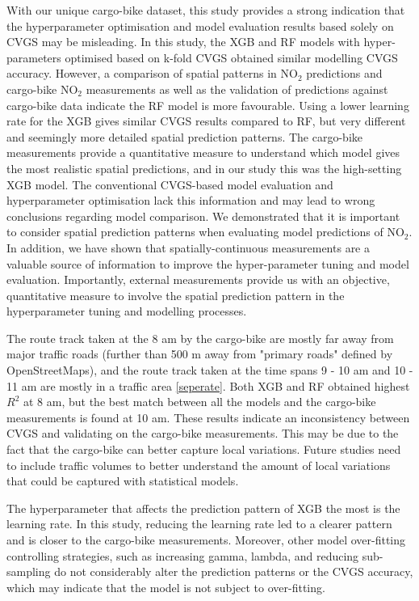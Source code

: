 \documentclass{article}
\begin{document}
With our unique cargo-bike dataset, this study provides a strong indication that the hyperparameter optimisation and model evaluation results based solely on CVGS may be misleading. In this study, the XGB and RF models with hyper-parameters optimised based on k-fold CVGS obtained similar modelling CVGS accuracy. However, a comparison of spatial patterns in NO$_2$ predictions and cargo-bike NO$_2$ measurements as well as the validation of predictions against cargo-bike data indicate the RF model is more favourable. Using a lower learning rate for the XGB gives similar CVGS results compared to RF, but very different and seemingly more detailed spatial prediction patterns. The cargo-bike measurements provide a quantitative measure to understand which model gives the most realistic spatial predictions, and in our study this was the high-setting XGB model. The conventional CVGS-based model evaluation and hyperparameter optimisation lack this information and may lead to wrong conclusions regarding model comparison. We demonstrated that it is important to consider spatial prediction patterns when evaluating model predictions of NO$_2$. In addition, we have shown that spatially-continuous measurements are a valuable source of information to improve the hyper-parameter tuning and model evaluation. Importantly, external measurements provide us with an objective, quantitative measure to involve the spatial prediction pattern in the hyperparameter tuning and modelling processes. 

The route track taken at the 8 am by the cargo-bike are mostly far away from major traffic roads (further than 500 m away from "primary roads" defined by OpenStreetMaps), and the route track taken at the time spans 9 - 10 am and 10 - 11 am are mostly in a traffic area \cref{seperate}. Both XGB and RF obtained highest $R^2$ at 8 am, but the best match between all the models and the cargo-bike measurements is found at 10 am. These results indicate an inconsistency between CVGS and validating on the cargo-bike measurements. This may be due to the fact that the cargo-bike can better capture local variations. Future studies need to include traffic volumes to better understand the amount of local variations that could be captured with statistical models. 

The hyperparameter that affects the prediction pattern of XGB the most is the learning rate. In this study, reducing the learning rate led to a clearer pattern and is closer to the cargo-bike measurements. Moreover, other model over-fitting controlling strategies, such as increasing gamma, lambda, and reducing sub-sampling do not considerably alter the prediction patterns or the CVGS accuracy, which may indicate that the model is not subject to over-fitting.  
\end{document}
